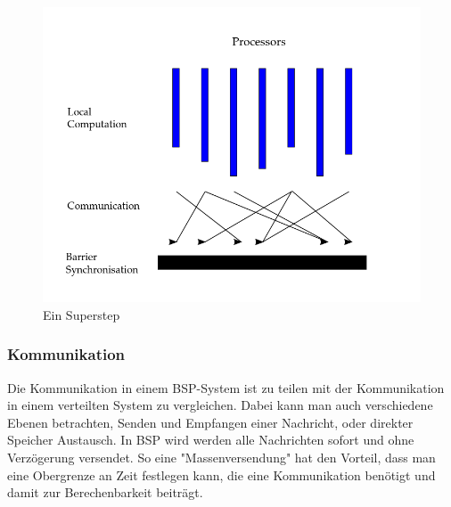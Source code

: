 \documentclass[a4paper,10pt]{scrartcl}
\begin{document}
\begin{figure}[h]
	\centering \includegraphics[scale = 0.4]{superstep.png}
	
	\caption{Ein Superstep}
\end{figure}

\newpage

\subsubsection{Kommunikation}
Die Kommunikation in einem BSP-System ist zu teilen mit der Kommunikation in einem verteilten System zu vergleichen. Dabei kann man auch verschiedene Ebenen betrachten, Senden und Empfangen einer Nachricht, oder direkter Speicher Austausch. In BSP wird werden alle Nachrichten sofort und ohne Verzögerung versendet. So eine "Massenversendung" hat den Vorteil, dass man eine Obergrenze an Zeit festlegen kann, die eine Kommunikation benötigt und damit zur Berechenbarkeit beiträgt. 
\end{document}
